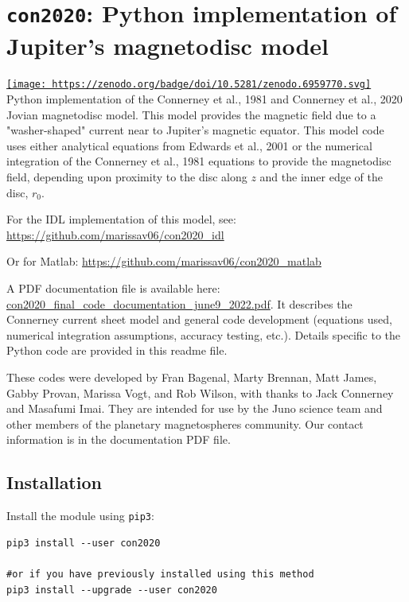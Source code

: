 	\section{\texttt{con2020}: Python implementation of Jupiter's magnetodisc model}


	\href{https://zenodo.org/badge/doi/10.5281/zenodo.6959770.svg}{\texttt{[image: https://zenodo.org/badge/doi/10.5281/zenodo.6959770.svg]}} \\
	Python implementation of the Connerney et al., 1981 and Connerney et al., 2020 Jovian magnetodisc model. This model provides the magnetic field due to a "washer-shaped" current near to Jupiter's magnetic equator. This model code uses either analytical equations from Edwards et al., 2001 or the numerical integration of the Connerney et al., 1981 equations to provide the magnetodisc field, depending upon proximity to the disc along $z$ and the inner edge of the disc, $r_0$.
	
	For the IDL implementation of this model, see:
	\href{https://github.com/marissav06/con2020_idl}{https://github.com/marissav06/con2020_idl}
	
	Or for Matlab:
	\href{https://github.com/marissav06/con2020_matlab}{https://github.com/marissav06/con2020_matlab}
	
	A PDF documentation file is available here: \href{https://github.com/gabbyprovan/con2020/files/8869108/con2020_final_code_documentation_june9_2022.pdf}{con2020_final_code_documentation_june9_2022.pdf}. It describes the Connerney current sheet model and general code development (equations used, numerical integration assumptions, accuracy testing, etc.). Details specific to the Python code are provided in this readme file.
	
	These codes were developed by Fran Bagenal, Marty Brennan, Matt James, Gabby Provan, Marissa Vogt, and Rob Wilson, with thanks to Jack Connerney and Masafumi Imai. They are intended for use by the Juno science team and other members of the planetary magnetospheres community. Our contact information is in the documentation PDF file.
	
	\subsection{Installation}
	
	Install the module using \texttt{pip3}:
	
	\begin{verbatim}
pip3 install --user con2020
	
#or if you have previously installed using this method
pip3 install --upgrade --user con2020
	\end{verbatim}
	
